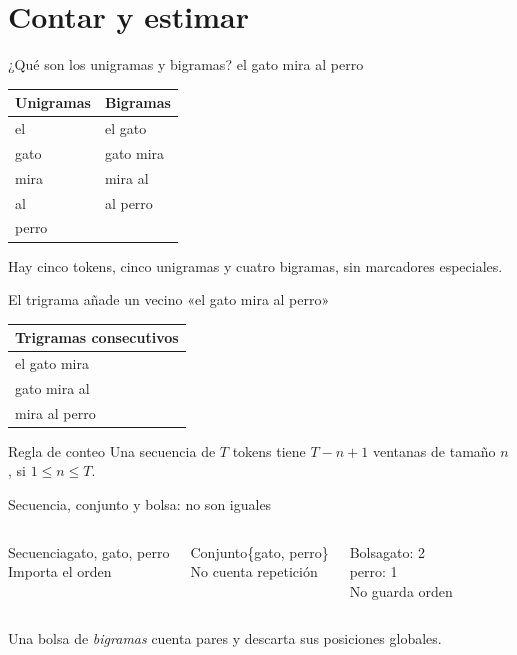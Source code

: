 \documentclass[aspectratio=169,10pt]{beamer}
\begin{document}
\section{Contar y estimar}
\begin{frame}{¿Qué son los unigramas y bigramas?}
\centering\large el gato mira al perro\\[5mm]
\begin{tabular}{ll}\toprule Unigramas & Bigramas\\\midrule
el & el gato\\gato & gato mira\\mira & mira al\\al & al perro\\perro & \\\bottomrule\end{tabular}
\vspace{4mm}\small Hay cinco tokens, cinco unigramas y cuatro bigramas, sin marcadores especiales.
\end{frame}

\begin{frame}{El trigrama añade un vecino}
\centering\large «el gato mira al perro»\\[4mm]
\begin{tabular}{l}\toprule Trigramas consecutivos\\\midrule
el gato mira\\gato mira al\\mira al perro\\\bottomrule\end{tabular}
\vspace{5mm}\begin{block}{Regla de conteo} Una secuencia de $T$ tokens tiene $T-n+1$ ventanas de tamaño $n$, si $1\le n\le T$.\end{block}
\end{frame}

\begin{frame}{Secuencia, conjunto y bolsa: no son iguales}
\begin{columns}[T]\begin{block}{Secuencia}\centering gato, gato, perro\\\vspace{2mm}\small Importa el orden\end{block}
\begin{block}{Conjunto}\centering\{gato, perro\}\\\vspace{2mm}\small No cuenta repetición\end{block}
\begin{block}{Bolsa}\centering gato: 2\\perro: 1\\\small No guarda orden\end{block}\end{columns}
\vspace{4mm}\small Una bolsa de \textit{bigramas} cuenta pares y descarta sus posiciones globales.
\end{frame}
\end{document}
